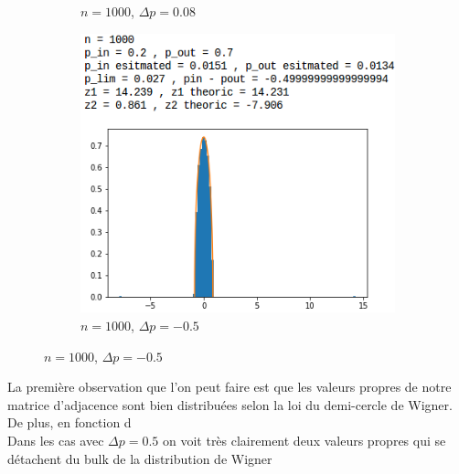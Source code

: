 \begin{figure}[H]
\begin{subfigure}{.5\textwidth}
		\caption{$n=1000$, $\Delta p=0.08$}
	\end{subfigure}
	\begin{subfigure}{.5\textwidth}
		\centering
		\includegraphics[scale=0.58]{static/spectral_n1000_pin02_pout07.png}
		\caption{$n=1000$, $\Delta p=-0.5$}
	\end{subfigure}
\end{figure}

La première observation que l'on peut faire est que les valeurs propres de notre matrice d'adjacence sont bien distribuées selon la loi du demi-cercle de Wigner.
De plus, en fonction d\\

Dans les cas avec $\Delta p = 0.5$ on voit très clairement deux valeurs propres qui se détachent du bulk de la distribution de Wigner 
